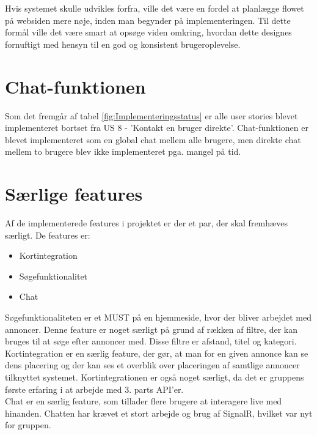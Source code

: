 Hvis systemet skulle udvikles forfra, ville det være en fordel at planlægge flowet på websiden mere nøje, inden man begynder på implementeringen. Til dette formål ville det være smart at opsøge viden omkring, hvordan dette designes fornuftigt med hensyn til en god og konsistent brugeroplevelse.

\section{Chat-funktionen}
Som det fremgår af tabel \ref{fig:Implementeringsstatus} er alle user stories blevet implementeret bortset fra US 8 - 'Kontakt en bruger direkte'. Chat-funktionen er blevet implementeret som en global chat mellem alle brugere, men direkte chat mellem to brugere blev ikke implementeret pga. mangel på tid.

	
\section{Særlige features}
Af de implementerede features i projektet er der et par, der skal fremhæves særligt.
De features er:
\begin{itemize}[noitemsep]
	\item Kortintegration
	\item Søgefunktionalitet 
	\item Chat
\end{itemize}

Søgefunktionaliteten er et MUST på en hjemmeside, hvor der bliver arbejdet med annoncer. Denne feature er noget særligt på grund af rækken af filtre, der kan bruges til at søge efter annoncer med. Disse filtre er afstand, titel og kategori. \\

Kortintegration er en særlig feature, der gør, at man for en given annonce kan se dens placering og der kan ses et overblik over  placeringen af samtlige annoncer tilknyttet systemet. Kortintegrationen er også noget særligt, da det er gruppens første erfaring i at arbejde med 3. parts API'er. \\

Chat er en særlig feature, som tillader flere brugere at interagere live med hinanden. Chatten har krævet et stort arbejde og brug af SignalR, hvilket var nyt for gruppen.




 